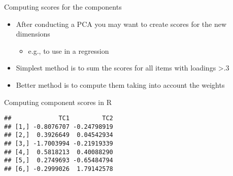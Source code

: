 \documentclass[
  ignorenonframetext,
]{beamer}
\newenvironment{Shaded}{\begin{snugshade}}{\end{snugshade}}
\newcommand{\DataTypeTok}[1]{\textcolor[rgb]{0.13,0.29,0.53}{#1}}
\newcommand{\DecValTok}[1]{\textcolor[rgb]{0.00,0.00,0.81}{#1}}
\newcommand{\KeywordTok}[1]{\textcolor[rgb]{0.13,0.29,0.53}{\textbf{#1}}}
\newcommand{\NormalTok}[1]{#1}
\newcommand{\OperatorTok}[1]{\textcolor[rgb]{0.81,0.36,0.00}{\textbf{#1}}}
\newcommand{\StringTok}[1]{\textcolor[rgb]{0.31,0.60,0.02}{#1}}
\providecommand{\tightlist}{%
  \setlength{\itemsep}{0pt}\setlength{\parskip}{0pt}}
\begin{document}
\begin{frame}{Computing scores for the components}
\protect\hypertarget{computing-scores-for-the-components}{}

\begin{itemize}
\tightlist
\item
  After conducting a PCA you may want to create scores for the new
  dimensions

  \begin{itemize}
  \tightlist
  \item
    e.g., to use in a regression
  \end{itemize}
\item
  Simplest method is to sum the scores for all items with loadings
  \textgreater\textbar.3\textbar{}
\item
  Better method is to compute them taking into account the weights
\end{itemize}

\end{frame}

\begin{frame}[fragile]{Computing component scores in R}
\protect\hypertarget{computing-component-scores-in-r}{}

\begin{Shaded}
\end{Shaded}

\begin{verbatim}
##             TC1         TC2
## [1,] -0.8076707 -0.24798919
## [2,]  0.3926649  0.04542934
## [3,] -1.7003994 -0.21919339
## [4,]  0.5818213  0.40088290
## [5,]  0.2749693 -0.65484794
## [6,] -0.2999026  1.79142578
\end{verbatim}

\end{frame}
\end{document}
